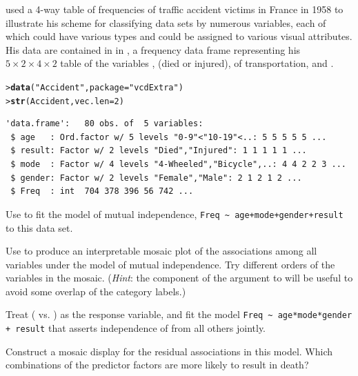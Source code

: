 \documentclass[11pt]{report}\usepackage[]{graphicx}\usepackage[]{color}
\makeatletter
\newcommand{\hlnum}[1]{\textcolor[rgb]{0.686,0.059,0.569}{#1}}%
\newcommand{\hlstr}[1]{\textcolor[rgb]{0.192,0.494,0.8}{#1}}%
\newcommand{\hlstd}[1]{\textcolor[rgb]{0.345,0.345,0.345}{#1}}%
\newcommand{\hlkwc}[1]{\textcolor[rgb]{0.333,0.667,0.333}{#1}}%
\newcommand{\hlkwd}[1]{\textcolor[rgb]{0.737,0.353,0.396}{\textbf{#1}}}%
\newenvironment{kframe}{%
 \def\at@end@of@kframe{}%
 \ifinner\ifhmode%
  \def\at@end@of@kframe{\end{minipage}}%
  \begin{minipage}{\columnwidth}%
 \fi\fi%
 \def\FrameCommand##1{\hskip\@totalleftmargin \hskip-\fboxsep
 \colorbox{shadecolor}{##1}\hskip-\fboxsep
     \hskip-\linewidth \hskip-\@totalleftmargin \hskip\columnwidth}%
 \MakeFramed {\advance\hsize-\width
   \@totalleftmargin\z@ \linewidth\hsize
   \@setminipage}}%
 {\par\unskip\endMakeFramed%
 \at@end@of@kframe}
\newenvironment{knitrout}{}{} %
\renewenvironment{knitrout}{\small\renewcommand{\baselinestretch}{.85}}{} %
\makeatother
\begin{document}
\begin{Exercises}
  \exercise\label{lab:mosaic-accident} \citet[pp. 30--31]{Bertin:83} used a 4-way table of frequencies of traffic accident victims in France in 1958
  to illustrate his scheme for classifying data sets by numerous variables, each of which could have various types
  and could be assigned to various visual attributes. His data are contained in  in ,
  a frequency data frame representing his $5 \times 2 \times 4 \times 2$ table of the variables
  ,  (died or injured),  of transportation, and .
\begin{knitrout}
\color{fgcolor}\begin{kframe}
\begin{alltt}
\hlstd{> }\hlkwd{data}\hlstd{(}\hlstr{"Accident"}\hlstd{,} \hlkwc{package} \hlstd{=} \hlstr{"vcdExtra"}\hlstd{)}
\hlstd{> }\hlkwd{str}\hlstd{(Accident,} \hlkwc{vec.len}\hlstd{=}\hlnum{2}\hlstd{)}
\end{alltt}
\begin{verbatim}
'data.frame':	80 obs. of  5 variables:
 $ age   : Ord.factor w/ 5 levels "0-9"<"10-19"<..: 5 5 5 5 5 ...
 $ result: Factor w/ 2 levels "Died","Injured": 1 1 1 1 1 ...
 $ mode  : Factor w/ 4 levels "4-Wheeled","Bicycle",..: 4 4 2 2 3 ...
 $ gender: Factor w/ 2 levels "Female","Male": 2 1 2 1 2 ...
 $ Freq  : int  704 378 396 56 742 ...
\end{verbatim}
\end{kframe}
\end{knitrout}
    \begin{enumerate*}
      \item Use  to fit the model of mutual independence, \verb|Freq ~ age+mode+gender+result| to
      this data set.
      \item Use  to produce an interpretable mosaic plot of the associations among all variables under the
      model of mutual independence.  Try different orders of the variables in the mosaic.  (\emph{Hint}: the 
       component of the 
       argument to  will be useful to avoid some overlap of the category labels.)
      \item Treat  ( vs. ) as the response variable, and fit the model \newline
      \verb|Freq ~ age*mode*gender + result| that asserts independence of  from all others jointly.
      \item Construct a mosaic display for the residual associations in this model.  Which combinations of the
      predictor factors are more likely to result in death?
    \end{enumerate*}


\end{Exercises}
\end{document}
